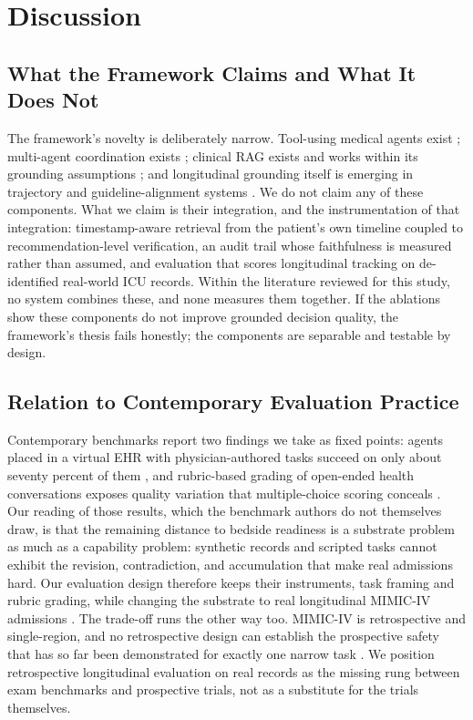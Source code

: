\section{Discussion}

\subsection{What the Framework Claims and What It Does Not}

The framework's novelty is deliberately narrow. Tool-using medical agents exist
\cite{gao2025txagent,liu2025riskagent,fallahpour2025medrax}; multi-agent coordination exists
\cite{wu2024autogen,tran2025collaboration}; clinical RAG exists and works within its grounding
assumptions \cite{zhao2025medrag,ke2025ragfitness}; and longitudinal grounding itself is
emerging in trajectory and guideline-alignment systems
\cite{li2026clicare,zeng2025trajcoa,cui2025timer}. We do not claim any of these components.
What we claim is their integration, and the instrumentation of that integration:
timestamp-aware retrieval from the patient's own timeline coupled to recommendation-level
verification, an audit trail whose faithfulness is measured rather than assumed, and
evaluation that scores longitudinal tracking on de-identified real-world ICU records. Within
the literature reviewed for this study, no system combines these, and none measures them
together. If the ablations show these components do not improve grounded decision quality,
the framework's thesis fails honestly; the components are separable and testable by design.

\subsection{Relation to Contemporary Evaluation Practice}

Contemporary benchmarks report two findings we take as fixed points: agents placed in a
virtual EHR with physician-authored tasks succeed on only about seventy percent of them
\cite{jiang2025medagentbench}, and rubric-based grading of open-ended health conversations exposes
quality variation that multiple-choice scoring conceals \cite{arora2025healthbench}. Our reading
of those results, which the benchmark authors do not themselves draw, is that the remaining
distance to bedside readiness is a substrate problem as much as a capability problem:
synthetic records and scripted tasks cannot exhibit the revision, contradiction, and
accumulation that make real admissions hard. Our evaluation design therefore keeps their
instruments, task framing and rubric grading, while changing the substrate to real
longitudinal MIMIC-IV admissions \cite{johnson2023mimic,lovon2025mimic}. The trade-off runs the
other way too. MIMIC-IV is retrospective and single-region, and no retrospective design can
establish the prospective safety that has so far been demonstrated for exactly one narrow
task \cite{shashikumar2025sepsis}. We position retrospective longitudinal evaluation on real
records as the missing rung between exam benchmarks and prospective trials, not as a
substitute for the trials themselves.

